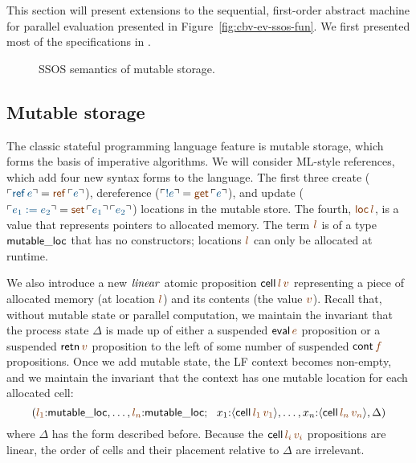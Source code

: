 This section will present extensions to the sequential, first-order
abstract machine for parallel evaluation presented in
Figure~\ref{fig:cbv-ev-ssos-fun}. We first presented 
most of the specifications in
\cite{pfenning09substructural}.

\begin{figure}[t]
\caption{SSOS semantics of mutable storage.}
\label{fig:ssos-mutable}
\end{figure}

\subsection{Mutable storage}
\label{sec:mutable-storage}

The classic stateful programming language feature is mutable storage,
which forms the basis of imperative algorithms. We will consider
ML-style references, which add four new syntax forms to the language.
The first three create ($\interp{{\sf ref}\,e} = \lf{{\sf
  ref}\,\interp{e}}$), dereference ($\interp{{!}e} = \lf{{\sf
  get}\,\interp{e}}$), and update ($\interp{e_1 := e_2} = \lf{{\sf
  set}\,\interp{e_1}\,\interp{e_2}}$) locations in the mutable
store. The fourth, $\lf{{\sf loc}\,l}$, is a value that represents pointers
to allocated memory. The term $\lf{l}$ is of a type ${\sf mutable\_loc}$
that has no constructors; locations $\lf{l}$ can only be allocated at
runtime.

We also introduce a new ${\it linear}$ atomic proposition ${\sf
  cell}\,\lf{l}\,\lf{v}$ representing a piece of allocated memory (at location
$\lf{l}$) and its contents (the value $\lf{v}$). Recall that, without mutable
state or parallel computation, we maintain the invariant that the
process state $\Delta$ is made up of either a suspended ${\sf eval}\,\lf{e}$
proposition or a suspended ${\sf retn}\,\lf{v}$ proposition to the left of
some number of suspended ${\sf cont}\,\lf{f}$ propositions. Once we add
mutable state, the LF context becomes non-empty, and we maintain the
invariant that the context has one mutable location for each allocated
cell:
\[
(\lf{l_1}{:}{\sf mutable\_loc}, \ldots, \lf{l_n}{:}{\sf mutable\_loc}; ~~
 x_1{:}\susp{{\sf cell}\,\lf{l_1}\,\lf{v_1}}, \ldots, 
 x_n{:}\susp{{\sf cell}\,\lf{l_n}\,\lf{v_n}}, 
 \Delta)
\]
where $\Delta$ has the form described before. Because the ${\sf
  cell}\,\lf{l_i}\,\lf{v_i}$ propositions are linear, the order of cells and
their placement relative to $\Delta$ are irrelevant.

